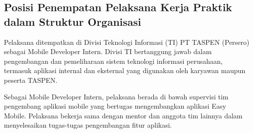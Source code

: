 \subsection{Posisi Penempatan Pelaksana Kerja Praktik dalam Struktur Organisasi}
\label{sec:posisiPenempatan}
Pelaksana ditempatkan di Divisi Teknologi Informasi (TI) PT TASPEN (Persero)
sebagai Mobile Developer Intern. Divisi TI bertanggung jawab dalam pengembangan
dan pemeliharaan sistem teknologi informasi perusahaan, termasuk aplikasi
internal dan eksternal yang digunakan oleh karyawan maupun peserta TASPEN.

Sebagai Mobile Developer Intern, pelaksana berada di bawah supervisi tim
pengembang aplikasi mobile yang bertugas mengembangkan aplikasi Easy Mobile.
Pelaksana bekerja sama dengan mentor dan anggota tim lainnya dalam menyelesaikan
tugas-tugas pengembangan fitur aplikasi.
